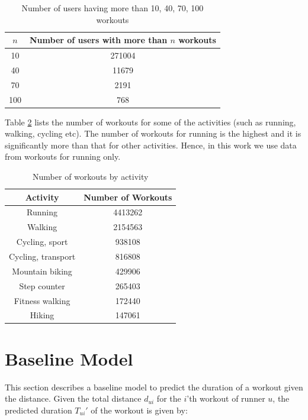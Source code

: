 \documentclass{acm_proc_article-sp}
\begin{document}
\begin{table}[h]
\centering
\begin{tabular}{|c|c|} \hline
\bf{$n$} & \bf{Number of users with more than $n$ workouts}  \\ \hline
10  &  271004        \\ \hline
40  &  11679   \\ \hline
70  &  2191  \\ \hline
100 &  768 \\ \hline
\end{tabular}
\caption{Number of users having more than 10, 40, 70, 100 workouts}
\label{tableStatsUsers}
\end{table}

Table \ref{tableStatsByActivity} lists the number of workouts for some of the activities (such as running, walking, cycling etc). The number of workouts for running is the highest and it is significantly more than that for other activities. Hence, in this work we use data from workouts for running only.

\begin{table}[h]
\centering
\begin{tabular}{|c|c|} \hline
\bf{Activity} & \bf{Number of Workouts}  \\ \hline
Running  &           4413262 \\ \hline
Walking  &           2154563 \\ \hline
Cycling, sport  &     938108 \\ \hline
Cycling, transport & 816808 \\ \hline
Mountain biking  &   429906 \\ \hline
Step counter     &   265403 \\ \hline
Fitness walking   &  172440 \\ \hline
Hiking &   147061 \\ \hline
\end{tabular}
\caption{Number of workouts by activity}
\label{tableStatsByActivity}
\end{table}


\section{Baseline Model}
\label{secBaselineModel}
This section describes a baseline model to predict the duration of a workout given the distance. Given the total distance $d_{ui}$ for the $i$'th workout of runner $u$, the predicted duration $T_{ui}'$ of the workout is given by:
\end{document}
